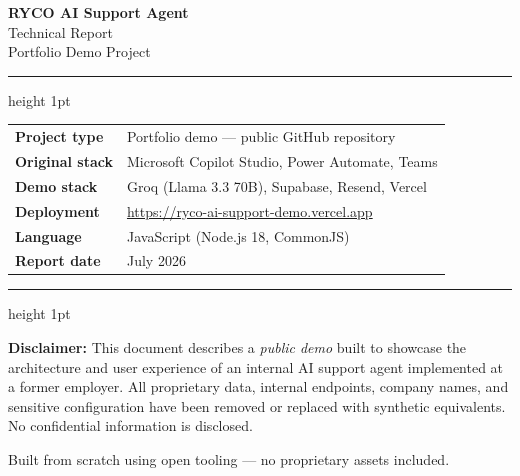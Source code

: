 \documentclass[12pt, a4paper]{article}
\begin{document}
\begin{titlepage}
  \centering
  \vspace*{2cm}

  {\Huge\bfseries\color{accent} RYCO AI Support Agent}\\[0.6em]
  {\Large\color{muted} Technical Report}\\[0.3em]
  {\large Portfolio Demo Project}

  \vspace{1.5cm}
  \hrule height 1pt
  \vspace{1cm}

  \begin{tabular}{ll}
    \textbf{Project type}   & Portfolio demo — public GitHub repository \\[4pt]
    \textbf{Original stack} & Microsoft Copilot Studio, Power Automate, Teams \\[4pt]
    \textbf{Demo stack}     & Groq (Llama 3.3 70B), Supabase, Resend, Vercel \\[4pt]
    \textbf{Deployment}     & \url{https://ryco-ai-support-demo.vercel.app} \\[4pt]
    \textbf{Language}       & JavaScript (Node.js 18, CommonJS) \\[4pt]
    \textbf{Report date}    & July 2026 \\[4pt]
  \end{tabular}

  \vspace{1cm}
  \hrule height 1pt
  \vspace{2cm}

  \begin{notebox}
    \textbf{Disclaimer:} This document describes a \emph{public demo} built to showcase
    the architecture and user experience of an internal AI support agent implemented
    at a former employer. All proprietary data, internal endpoints, company names,
    and sensitive configuration have been removed or replaced with synthetic equivalents.
    No confidential information is disclosed.
  \end{notebox}

  \vfill
  {\small\color{muted} Built from scratch using open tooling — no proprietary assets included.}
\end{titlepage}

\tableofcontents
\clearpage
\end{document}
